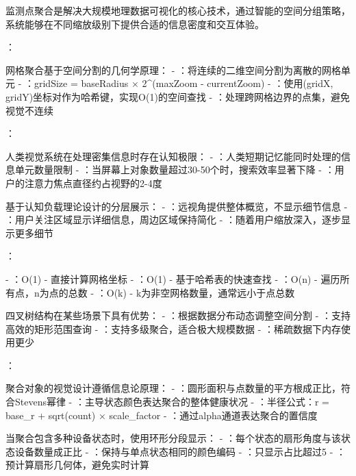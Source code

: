 {监测点聚合是解决大规模地理数据可视化的核心技术，通过智能的空间分组策略，系统能够在不同缩放级别下提供合适的信息密度和交互体验。

：

网格聚合基于空间分割的几何学原理：
- ：将连续的二维空间分割为离散的网格单元
- ：gridSize = baseRadius × 2^(maxZoom - currentZoom)
- ：使用(gridX, gridY)坐标对作为哈希键，实现O(1)的空间查找
- ：处理跨网格边界的点集，避免视觉不连续

：

人类视觉系统在处理密集信息时存在认知极限：
- ：人类短期记忆能同时处理的信息单元数量限制
- ：当屏幕上对象数量超过30-50个时，搜索效率显著下降
- ：用户的注意力焦点直径约占视野的2-4度

基于认知负载理论设计的分层展示：
- ：远视角提供整体概览，不显示细节信息
- ：用户关注区域显示详细信息，周边区域保持简化
- ：随着用户缩放深入，逐步显示更多细节

：

- ：O(1) - 直接计算网格坐标
- ：O(1) - 基于哈希表的快速查找
- ：O(n) - 遍历所有点，n为点的总数
- ：O(k) - k为非空网格数量，通常远小于点总数

四叉树结构在某些场景下具有优势：
- ：根据数据分布动态调整空间分割
- ：支持高效的矩形范围查询
- ：支持多级聚合，适合极大规模数据
- ：稀疏数据下内存使用更少

：

聚合对象的视觉设计遵循信息论原理：
- ：圆形面积与点数量的平方根成正比，符合Stevens幂律
- ：主导状态颜色表达聚合的整体健康状况
- ：半径公式：r = base_r + sqrt(count) × scale_factor
- ：通过alpha通道表达聚合的置信度

当聚合包含多种设备状态时，使用环形分段显示：
- ：每个状态的扇形角度与该状态设备数量成正比
- ：保持与单点状态相同的颜色编码
- ：只显示占比超过5%
- ：预计算扇形几何体，避免实时计算

}
